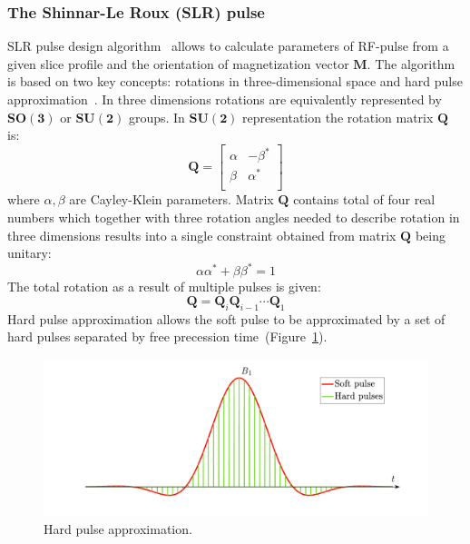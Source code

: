 \subsubsection{The Shinnar-Le Roux (SLR) pulse}
SLR pulse design algorithm~\cite{Leroux:1990tk} allows to calculate parameters of RF-pulse from a given slice profile and  the orientation of magnetization vector $\mathbf{M}$. 
The algorithm is based on two key concepts: rotations in three-dimensional space and hard pulse approximation~\cite{RNDT24}. 
In three dimensions rotations are equivalently represented by $\mathbf{SO(3)}$ or $\mathbf{SU(2)}$ groups. 
In $\mathbf{SU(2)}$ representation the rotation matrix $\mathbf{Q}$ is:
\begin{equation}\label{eq: Rotation matrix Q}
\mathbf{Q} = 
	\begin{bmatrix}
    \alpha & -\beta^*\\
    \beta & \alpha^*\\
   	\end{bmatrix}
\end{equation}
where $\alpha, \beta$ are Cayley-Klein parameters. 
Matrix $\mathbf{Q}$ contains total of four real numbers which together with three rotation angles needed to describe rotation in three dimensions results into a single constraint obtained from matrix $\mathbf{Q}$ being unitary:
\begin{equation}\label{eq: C-K normalization}
\alpha \alpha^*+\beta\beta^* = 1
\end{equation}
The total rotation as a result of multiple pulses is given:
\begin{equation}\label{eq: Q rotations}
\mathbf{Q} = \mathbf{Q}_{i}\mathbf{Q}_{i-1}\cdots\mathbf{Q}_{1}
\end{equation}
Hard pulse approximation allows the soft pulse to be approximated by a set of hard pulses separated by free precession time~(Figure~\ref{fig:SLR}).
\begin{figure}[!ht]
\vspace{+0.2cm}
\centering
\includegraphics[scale=0.45]{Figures/SLR.pdf}
\caption[Hard pulse approximation]{Hard pulse approximation.}
\label{fig:SLR}
\end{figure}
